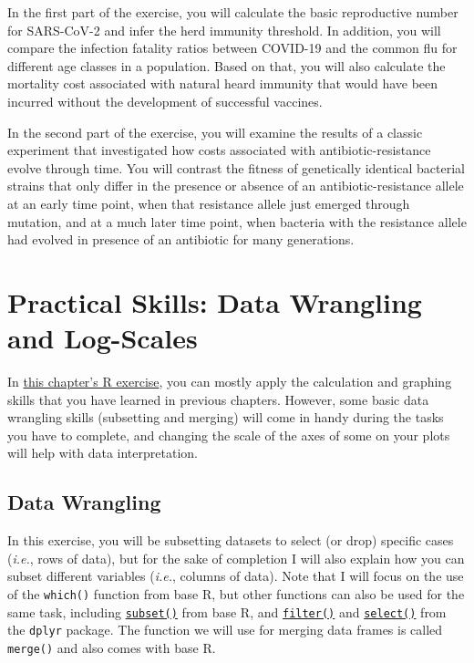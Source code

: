 \documentclass[
]{book}
\begin{document}
In the first part of the exercise, you will calculate the basic reproductive number for SARS-CoV-2 and infer the herd immunity threshold. In addition, you will compare the infection fatality ratios between COVID-19 and the common flu for different age classes in a population. Based on that, you will also calculate the mortality cost associated with natural heard immunity that would have been incurred without the development of successful vaccines.

In the second part of the exercise, you will examine the results of a classic experiment that investigated how costs associated with antibiotic-resistance evolve through time. You will contrast the fitness of genetically identical bacterial strains that only differ in the presence or absence of an antibiotic-resistance allele at an early time point, when that resistance allele just emerged through mutation, and at a much later time point, when bacteria with the resistance allele had evolved in presence of an antibiotic for many generations.

\hypertarget{practical-skills-data-wrangling-and-log-scales}{%
\section{Practical Skills: Data Wrangling and Log-Scales}\label{practical-skills-data-wrangling-and-log-scales}}

In \href{exercises/BIOL520-ex12.zip}{this chapter's R exercise}, you can mostly apply the calculation and graphing skills that you have learned in previous chapters. However, some basic data wrangling skills (subsetting and merging) will come in handy during the tasks you have to complete, and changing the scale of the axes of some on your plots will help with data interpretation.

\hypertarget{data-wrangling}{%
\subsection{Data Wrangling}\label{data-wrangling}}

In this exercise, you will be subsetting datasets to select (or drop) specific cases (\emph{i.e.}, rows of data), but for the sake of completion I will also explain how you can subset different variables (\emph{i.e.}, columns of data). Note that I will focus on the use of the \texttt{which()} function from base R, but other functions can also be used for the same task, including \href{https://www.rdocumentation.org/packages/base/versions/3.6.2/topics/subset}{\texttt{subset()}} from base R, and \href{https://www.rdocumentation.org/packages/dplyr/versions/0.7.8/topics/filter}{\texttt{filter()}} and \href{https://www.rdocumentation.org/packages/dplyr/versions/0.7.8/topics/select}{\texttt{select()}} from the \texttt{dplyr} package. The function we will use for merging data frames is called \texttt{merge()} and also comes with base R.
\end{document}
